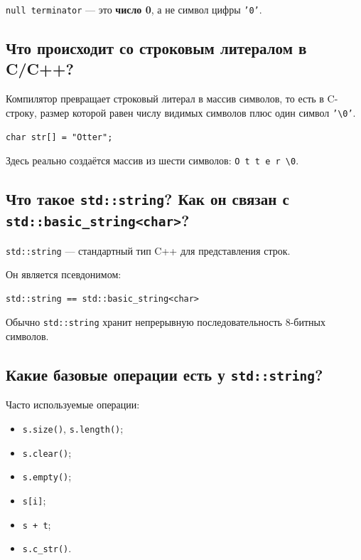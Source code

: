 \texttt{null terminator} --- это \textbf{число 0}, а не символ цифры \texttt{'0'}.


\subsection{Что происходит со строковым литералом в C/C++?}

Компилятор превращает строковый литерал в массив символов, то есть в C-строку, размер которой равен числу видимых символов плюс один символ \texttt{'\textbackslash 0'}.

\begin{example}
\begin{verbatim}
char str[] = "Otter";
\end{verbatim}
\end{example}

Здесь реально создаётся массив из шести символов: \texttt{O t t e r \textbackslash 0}.


\subsection{Что такое \texttt{std::string}? Как он связан с \texttt{std::basic\_string<char>}?}

\texttt{std::string} --- стандартный тип C++ для представления строк.

Он является псевдонимом:
\begin{verbatim}
std::string == std::basic_string<char>
\end{verbatim}

Обычно \texttt{std::string} хранит непрерывную последовательность 8-битных символов.


\subsection{Какие базовые операции есть у \texttt{std::string}?}

Часто используемые операции:
\begin{itemize}
    \item \texttt{s.size()}, \texttt{s.length()};
    \item \texttt{s.clear()};
    \item \texttt{s.empty()};
    \item \texttt{s[i]};
    \item \texttt{s + t};
    \item \texttt{s.c\_str()}.
\end{itemize}

